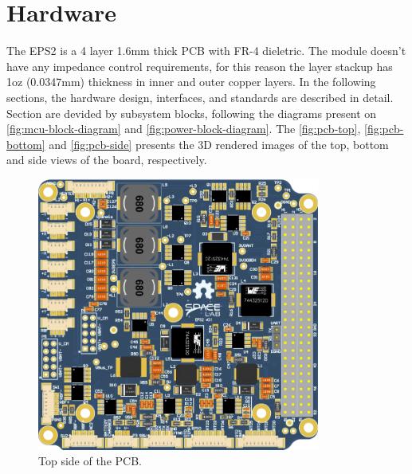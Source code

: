 %
%
%
%
%

%
%
%
%
%
%

\chapter{Hardware} \label{ch:hardware}

The EPS2 is a 4 layer 1.6mm thick PCB with FR-4 dieletric. The module doesn't have any impedance control requirements, for this reason the layer stackup has 1oz (0.0347mm) thickness in inner and outer copper layers. In the following sections, the hardware design, interfaces, and standards are described in detail. Section are devided by subsystem blocks, following the diagrams present on \autoref{fig:mcu-block-diagram} and \autoref{fig:power-block-diagram}. The \autoref{fig:pcb-top}, \autoref{fig:pcb-bottom} and \autoref{fig:pcb-side} presents the 3D rendered images of the top, bottom and side views of the board, respectively.

\begin{figure}[!ht]
    \begin{center}
        \includegraphics[width=93mm]{figures/eps2-pcb-top.png}
        \caption{Top side of the PCB.}
        \label{fig:pcb-top}
    \end{center}
\end{figure}

